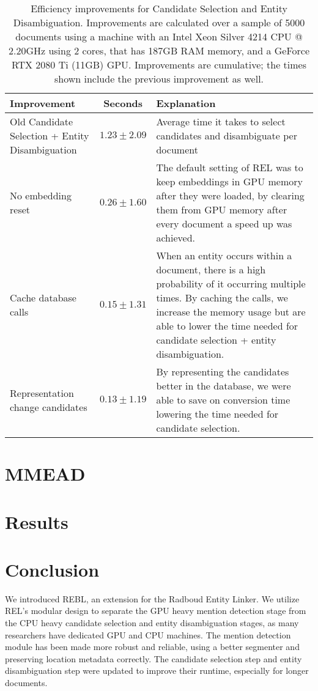 \begin{table}
	\caption{Efficiency improvements for Candidate Selection and Entity Disambiguation. Improvements are calculated over a sample of 5000 documents using a machine with an Intel Xeon Silver 4214 CPU @ 2.20GHz using 2 cores, that has 187GB RAM memory, and a GeForce RTX 2080 Ti (11GB) GPU. Improvements are cumulative; the times shown include the previous improvement as well.}
	\label{tab:efficiency}
	\begin{tabular}{p{4cm} c p{5cm}}
		\toprule
		Improvement & Seconds & Explanation\\
		\midrule
		Old Candidate Selection + Entity Disambiguation & $1.23 \pm 2.09$ & Average time it takes to select candidates and disambiguate per document\\
		\midrule
		No embedding reset & $0.26 \pm 1.60$ & The default setting of REL was to keep embeddings in GPU memory after they were loaded, by clearing them from GPU memory after every document a speed up was achieved.\\
		Cache database calls & $0.15 \pm 1.31$ & When an entity occurs within a document, there is a high probability of it occurring multiple times. By caching the calls, we increase the memory usage but are able to lower the time needed for candidate selection + entity disambiguation.  \\
		Representation change candidates & $0.13 \pm 1.19$ & By representing the candidates better in the database, we were able to save on conversion time lowering the time needed for candidate selection.\\
		\bottomrule
	\end{tabular}
\end{table}


\section{MMEAD}

\section{Results}

\section{Conclusion}
We introduced REBL, an extension for the Radboud Entity Linker. We utilize REL's modular design to separate the GPU heavy mention detection stage from the CPU heavy candidate selection and entity disambiguation stages, as many researchers have dedicated GPU and CPU machines. The mention detection module has been made more robust and reliable, using a better segmenter and preserving location metadata correctly.
The candidate selection step and entity disambiguation step were updated to improve their runtime, especially for longer documents. 

